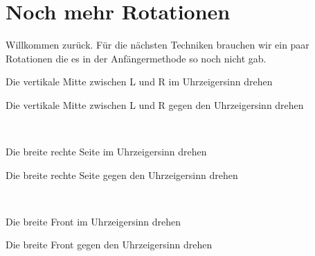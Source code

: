 \section{Noch mehr Rotationen}
Willkommen zurück. Für die nächsten Techniken brauchen wir ein paar Rotationen 
die es in der Anfängermethode so noch nicht gab. \\[1em]

\begin{instruction}{Die vertikale Mitte zwischen L und R im Uhrzeigersinn drehen}
  \vspace{1.3em}
  \RubikCubeSolved%
  \quad{}
\end{instruction}
\hfil
\begin{instruction}{Die vertikale Mitte zwischen L und R gegen den Uhrzeigersinn drehen}
  \vspace{1.3em}
  \RubikCubeSolved%
  \quad{}
\end{instruction}\\[3em]
\begin{instruction}{Die breite rechte Seite im Uhrzeigersinn drehen}
  \vspace{1.3em}
  \RubikCubeSolved%
  \quad{}
\end{instruction}
\hfil
\begin{instruction}{Die breite rechte Seite gegen den Uhrzeigersinn drehen}
  \vspace{1.3em}
  \RubikCubeSolved%
  \quad{}
\end{instruction}\\[3em]
\begin{instruction}{Die breite Front im Uhrzeigersinn drehen}
  \vspace{1.3em}
  \RubikCubeSolved%
  \quad{}
\end{instruction}
\hfil
\begin{instruction}{Die breite Front gegen den Uhrzeigersinn drehen}
  \vspace{1.3em}
  \RubikCubeSolved%
  \quad{}
\end{instruction}\\[3em]
